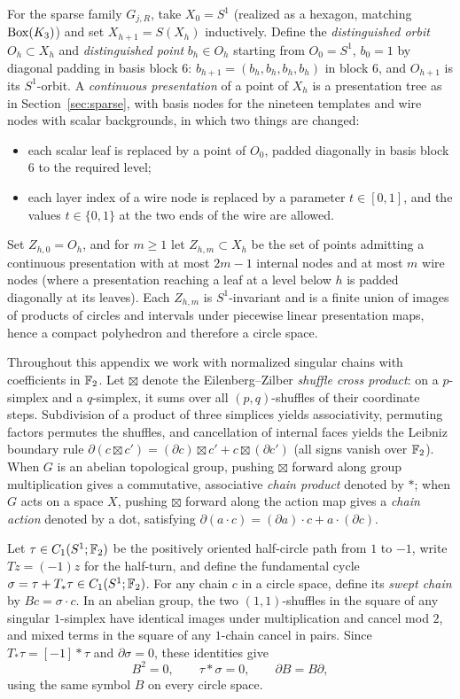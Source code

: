 For the sparse family $G_{j,R}$, take $X_0=S^1$ (realized as a hexagon, matching $\operatorname{Box}(K_3)$) and set $X_{h+1}=S(X_h)$ inductively. Define the \emph{distinguished orbit} $O_h\subset X_h$ and \emph{distinguished point} $b_h\in O_h$ starting from $O_0=S^1$, $b_0=1$ by diagonal padding in basis block $6$: $b_{h+1}=(b_h,b_h,b_h,b_h)$ in block $6$, and $O_{h+1}$ is its $S^1$-orbit. A \emph{continuous presentation} of a point of $X_h$ is a presentation tree as in Section~\ref{sec:sparse}, with basis nodes for the nineteen templates and wire nodes with scalar backgrounds, in which two things are changed:
\begin{itemize}
\item each scalar leaf is replaced by a point of $O_0$, padded diagonally in basis block $6$ to the required level;
\item each layer index of a wire node is replaced by a parameter $t\in[0,1]$, and the values $t\in\{0,1\}$ at the two ends of the wire are allowed.
\end{itemize}
Set $Z_{h,0}=O_h$, and for $m\ge1$ let $Z_{h,m}\subset X_h$ be the set of points admitting a continuous presentation with at most $2m-1$ internal nodes and at most $m$ wire nodes (where a presentation reaching a leaf at a level below $h$ is padded diagonally at its leaves). Each $Z_{h,m}$ is $S^1$-invariant and is a finite union of images of products of circles and intervals under piecewise linear presentation maps, hence a compact polyhedron and therefore a circle space.

Throughout this appendix we work with normalized singular chains with coefficients in $\mathbb F_2$. Let $\boxtimes$ denote the Eilenberg--Zilber \emph{shuffle cross product}: on a $p$-simplex and a $q$-simplex, it sums over all $(p,q)$-shuffles of their coordinate steps. Subdivision of a product of three simplices yields associativity, permuting factors permutes the shuffles, and cancellation of internal faces yields the Leibniz boundary rule $\partial(c\boxtimes c')=(\partial c)\boxtimes c'+c\boxtimes(\partial c')$ (all signs vanish over $\mathbb F_2$). When $G$ is an abelian topological group, pushing $\boxtimes$ forward along group multiplication gives a commutative, associative \emph{chain product} denoted by $*$; when $G$ acts on a space $X$, pushing $\boxtimes$ forward along the action map gives a \emph{chain action} denoted by a dot, satisfying $\partial(a\cdot c)=(\partial a)\cdot c+a\cdot(\partial c)$.

Let $\tau\in C_1(S^1;\mathbb F_2)$ be the positively oriented half-circle path from $1$ to $-1$, write $Tz=(-1)z$ for the half-turn, and define the fundamental cycle $\sigma=\tau+T_*\tau\in C_1(S^1;\mathbb F_2)$. For any chain $c$ in a circle space, define its \emph{swept chain} by $Bc=\sigma\cdot c$. In an abelian group, the two $(1,1)$-shuffles in the square of any singular $1$-simplex have identical images under multiplication and cancel mod $2$, and mixed terms in the square of any $1$-chain cancel in pairs. Since $T_*\tau=[-1]*\tau$ and $\partial\sigma=0$, these identities give
\begin{equation}\label{eq:circle-chain}
 B^2=0,\qquad \tau*\sigma=0,\qquad \partial B=B\partial,
\end{equation}
using the same symbol $B$ on every circle space.

